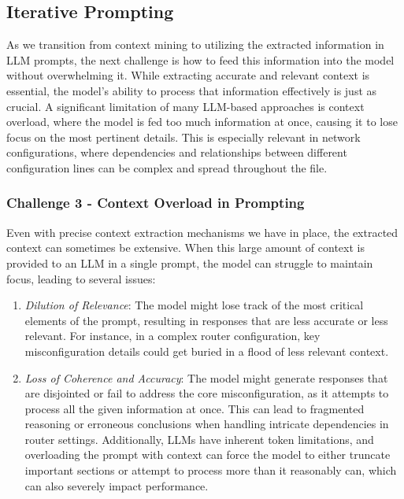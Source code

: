 \subsection{Iterative Prompting}\label{prompting_method}
As we transition from context mining to utilizing the extracted information in LLM prompts, the next challenge is how to feed this information into the model without overwhelming it. While extracting accurate and relevant context is essential, the model's ability to process that information effectively is just as crucial. A significant limitation of many LLM-based approaches is context overload, where the model is fed too much information at once, causing it to lose focus on the most pertinent details. This is especially relevant in network configurations, where dependencies and relationships between different configuration lines can be complex and spread throughout the file.

\subsubsection{Challenge 3 - Context Overload in Prompting}
\label{challenge_3}

Even with precise context extraction mechanisms we have in place, the extracted context can sometimes be extensive. When this large amount of context is provided to an LLM in a single prompt, the model can struggle to maintain focus, leading to several issues:
\begin{enumerate}
    \item \textit{Dilution of Relevance}: The model might lose track of the most critical elements of the prompt, resulting in responses that are less accurate or less relevant. For instance, in a complex router configuration, key misconfiguration details could get buried in a flood of less relevant context.
    \item \textit{Loss of Coherence and Accuracy}: The model might generate responses that are disjointed or fail to address the core misconfiguration, as it attempts to process all the given information at once. This can lead to fragmented reasoning or erroneous conclusions when handling intricate dependencies in router settings. Additionally, LLMs have inherent token limitations, and overloading the prompt with context can force the model to either truncate important sections or attempt to process more than it reasonably can, which can also severely impact performance.
\end{enumerate}

